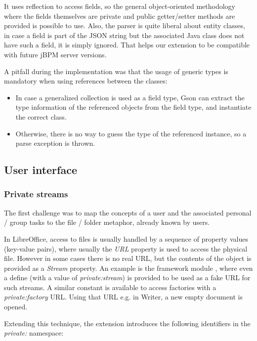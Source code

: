 It uses reflection to access fields, so the general object-oriented methodology
where the fields themselves are private and public getter/setter methods are
provided is possible to use. Also, the parser is quite liberal about entity
classes, in case a field is part of the JSON string but the associated Java
class does not have such a field, it is simply ignored. That helps our
extension to be compatible with future jBPM server versions.

A pitfall during the implementation was that the usage of generic types is
mandatory when using references between the classes:

\begin{itemize}
\item In case a generalized collection is used as a field type, Gson can extract the type information of the referenced objects from the field type, and instantiate the correct class.
\item Otherwise, there is no way to guess the type of the referenced instance, so a parse exception is thrown.
\end{itemize}

\subsection{User interface}

\subsubsection*{Private streams}

The first challenge was to map the concepts of a user and the associated
personal / group tasks to the file / folder metaphor, already known by users.

In LibreOffice, access to files is usually handled by a sequence of property
values (key-value pairs), where usually the \emph{URL} property is used to
access the physical file. However in some cases there is no real URL, but the
contents of the object is provided as a \emph{Stream} property.  An example is
the framework module \cite{lo-framework-module}, where even a define (with a
value of \emph{private:stream}) is provided to be used as a fake URL for such
streams.  A similar constant is available to access factories with a
\emph{private:factory} URL. Using that URL e.g. in Writer, a new empty document
is opened.

Extending this technique, the extension introduces the following identifiers in
the \emph{private:} namespace:

